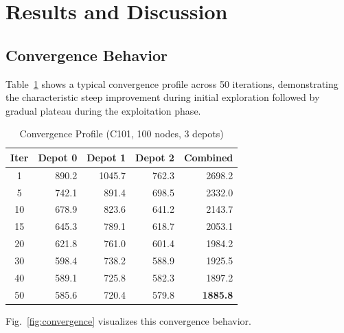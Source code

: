 \documentclass[10pt,conference]{IEEEtran}
\begin{document}
\section{Results and Discussion}

\subsection{Convergence Behavior}
Table~\ref{tab:convergence} shows a typical convergence profile across 50 iterations, demonstrating the characteristic steep improvement during initial exploration followed by gradual plateau during the exploitation phase.

\begin{table}[h]
\caption{Convergence Profile (C101, 100 nodes, 3 depots)}
\label{tab:convergence}
\begin{center}
\begin{tabular}{|c|r|r|r|r|}
\hline
\textbf{Iter} & \textbf{Depot 0} & \textbf{Depot 1} & \textbf{Depot 2} & \textbf{Combined} \\
\hline
1 & 890.2 & 1045.7 & 762.3 & 2698.2 \\
5 & 742.1 & 891.4 & 698.5 & 2332.0 \\
10 & 678.9 & 823.6 & 641.2 & 2143.7 \\
15 & 645.3 & 789.1 & 618.7 & 2053.1 \\
20 & 621.8 & 761.0 & 601.4 & 1984.2 \\
30 & 598.4 & 738.2 & 588.9 & 1925.5 \\
40 & 589.1 & 725.8 & 582.3 & 1897.2 \\
50 & 585.6 & 720.4 & 579.8 & \textbf{1885.8} \\
\hline
\end{tabular}
\end{center}
\end{table}

Fig.~\ref{fig:convergence} visualizes this convergence behavior.
\end{document}
